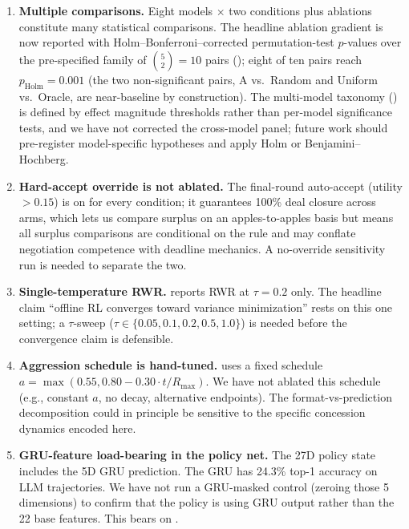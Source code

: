 \documentclass[11pt,a4paper]{article}
\begin{document}
\begin{enumerate}
\item \textbf{Multiple comparisons.} Eight models $\times$ two conditions plus ablations constitute many statistical comparisons. The headline ablation gradient is now reported with Holm--Bonferroni--corrected permutation-test $p$-values over the pre-specified family of $\binom{5}{2}\!=\!10$ pairs (); eight of ten pairs reach $p_\text{Holm} = 0.001$ (the two non-significant pairs, A vs.\ Random and Uniform vs.\ Oracle, are near-baseline by construction). The multi-model taxonomy () is defined by effect magnitude thresholds rather than per-model significance tests, and we have not corrected the cross-model panel; future work should pre-register model-specific hypotheses and apply Holm or Benjamini--Hochberg.

\item \textbf{Hard-accept override is not ablated.} The final-round auto-accept (utility $> 0.15$) is on for every condition; it guarantees 100\% deal closure across arms, which lets us compare surplus on an apples-to-apples basis but means all surplus comparisons are conditional on the rule and may conflate negotiation competence with deadline mechanics. A no-override sensitivity run is needed to separate the two.

\item \textbf{Single-temperature RWR.}  reports RWR at $\tau = 0.2$ only. The headline claim ``offline RL converges toward variance minimization'' rests on this one setting; a $\tau$-sweep ($\tau \in \{0.05, 0.1, 0.2, 0.5, 1.0\}$) is needed before the convergence claim is defensible.

\item \textbf{Aggression schedule is hand-tuned.}  uses a fixed schedule $a = \max(0.55, 0.80 - 0.30 \cdot t / R_{\max})$. We have not ablated this schedule (e.g., constant $a$, no decay, alternative endpoints). The format-vs-prediction decomposition could in principle be sensitive to the specific concession dynamics encoded here.

\item \textbf{GRU-feature load-bearing in the policy net.} The 27D policy state includes the 5D GRU prediction. The GRU has 24.3\% top-1 accuracy on LLM trajectories. We have not run a GRU-masked control (zeroing those 5 dimensions) to confirm that the policy is using GRU output rather than the 22 base features. This bears on .
\end{enumerate}
\end{document}
